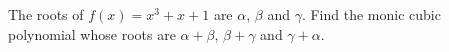 The roots of $f(x)=x^3+x+1$ are $\alpha$, $\beta$ and $\gamma$. Find the monic cubic polynomial whose roots are $\alpha+\beta$, $\beta+\gamma$ and $\gamma+\alpha$.

